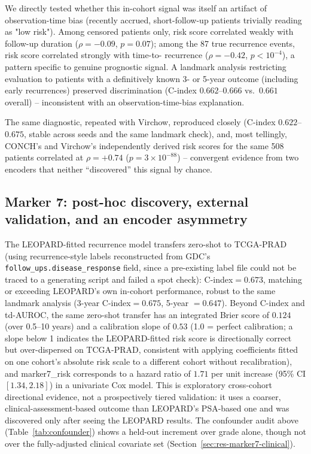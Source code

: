 We directly tested whether this in-cohort signal was itself an artifact of observation-time
bias (recently accrued, short-follow-up patients trivially reading as "low risk"). Among
censored patients only, risk score correlated weakly with follow-up duration ($\rho=-0.09$,
$p=0.07$); among the 87 true recurrence events, risk score correlated strongly with time-to-
recurrence ($\rho=-0.42$, $p<10^{-4}$), a pattern specific to genuine prognostic signal. A
landmark analysis restricting evaluation to patients with a definitively known 3- or 5-year
outcome (including early recurrences) preserved discrimination (C-index $0.662$--$0.666$
vs.\ $0.661$ overall) -- inconsistent with an observation-time-bias explanation.

The same diagnostic, repeated with Virchow, reproduced closely (C-index $0.622$--$0.675$,
stable across seeds and the same landmark check), and, most tellingly, CONCH's and Virchow's
independently derived risk scores for the same 508 patients correlated at $\rho=+0.74$
($p=3\times10^{-88}$) -- convergent evidence from two encoders that neither ``discovered''
this signal by chance.

\subsection{Marker 7: post-hoc discovery, external validation, and an encoder asymmetry}
\label{sec:res-marker7}

The LEOPARD-fitted recurrence model transfers zero-shot to TCGA-PRAD (using recurrence-style
labels reconstructed from GDC's \texttt{follow\_ups.disease\_response} field, since a
pre-existing label file could not be traced to a generating script and failed a spot check):
C-index$=0.673$, matching or exceeding LEOPARD's own in-cohort performance, robust to the same
landmark analysis (3-year C-index$=0.675$, 5-year $=0.647$). Beyond C-index and td-AUROC, the
same zero-shot transfer has an integrated Brier score of $0.124$ (over 0.5--10 years) and a
calibration slope of $0.53$ (1.0 = perfect calibration; a slope below 1 indicates the
LEOPARD-fitted risk score is directionally correct but over-dispersed on TCGA-PRAD, consistent
with applying coefficients fitted on one cohort's absolute risk scale to a different cohort
without recalibration), and marker7\_risk corresponds to a hazard ratio of $1.71$ per unit
increase (95\% CI $[1.34, 2.18]$) in a univariate Cox model. This is exploratory cross-cohort
directional evidence, not a prospectively tiered validation: it uses a coarser,
clinical-assessment-based outcome than LEOPARD's PSA-based one and was discovered only after
seeing the LEOPARD results. The confounder audit above (Table~\ref{tab:confounder}) shows a
held-out increment over grade alone, though not over the fully-adjusted clinical covariate set
(Section~\ref{sec:res-marker7-clinical}).

